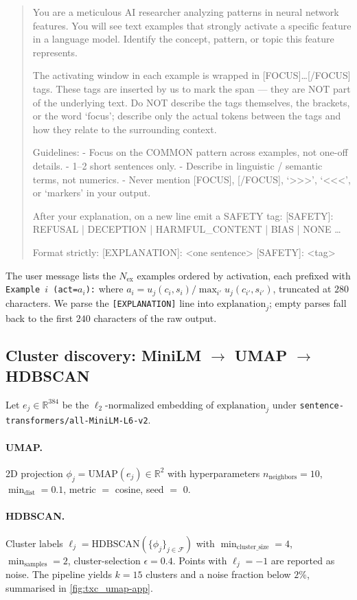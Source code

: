 \begin{quote}\small\ttfamily
You are a meticulous AI researcher analyzing patterns in neural network features. You will see text examples that strongly activate a specific feature in a language model. Identify the concept, pattern, or topic this feature represents.

The activating window in each example is wrapped in [FOCUS]\ldots[/FOCUS] tags. These tags are inserted by us to mark the span --- they are NOT part of the underlying text. Do NOT describe the tags themselves, the brackets, or the word `focus'; describe only the actual tokens between the tags and how they relate to the surrounding context.

Guidelines:
- Focus on the COMMON pattern across examples, not one-off details.
- 1--2 short sentences only.
- Describe in linguistic / semantic terms, not numerics.
- Never mention [FOCUS], [/FOCUS], `>{>>}', `{<<}<', or `markers' in your output.

After your explanation, on a new line emit a SAFETY tag:
[SAFETY]: REFUSAL | DECEPTION | HARMFUL\_CONTENT | BIAS | NONE
\ldots

Format strictly:
[EXPLANATION]: <one sentence>
[SAFETY]: <tag>
\end{quote}

The user message lists the $N_{\text{ex}}$ examples ordered by activation, each prefixed with \texttt{Example $i$ (act=$a_i$):} where $a_i = u_j(c_i, s_i)/\max_{i'} u_j(c_{i'}, s_{i'})$, truncated at $280$ characters. We parse the \texttt{[EXPLANATION]} line into $\text{explanation}_j$; empty parses fall back to the first $240$ characters of the raw output.

\subsection{Cluster discovery: MiniLM $\to$ UMAP $\to$ HDBSCAN}
\label{app:meta-cluster}
Let $e_j\in\mathbb{R}^{384}$ be the $\ell_2$-normalized embedding of $\text{explanation}_j$ under \texttt{sentence-transformers/all-MiniLM-L6-v2}.

\paragraph{UMAP.} 2D projection $\phi_j = \mathrm{UMAP}(e_j) \in \mathbb{R}^2$ with hyperparameters $n_{\text{neighbors}}{=}10$, $\min_{\text{dist}}{=}0.1$, metric $=$ cosine, seed $=$ 0.

\paragraph{HDBSCAN.} Cluster labels $\ell_j = \mathrm{HDBSCAN}(\{\phi_j\}_{j\in\mathcal{F}})$ with $\min_{\text{cluster\_size}}{=}4$, $\min_{\text{samples}}{=}2$, cluster-selection $\epsilon = 0.4$. Points with $\ell_j = -1$ are reported as noise. The pipeline yields $k{=}15$ clusters and a noise fraction below $2\%$, summarised in \cref{fig:txc_umap-app}.

